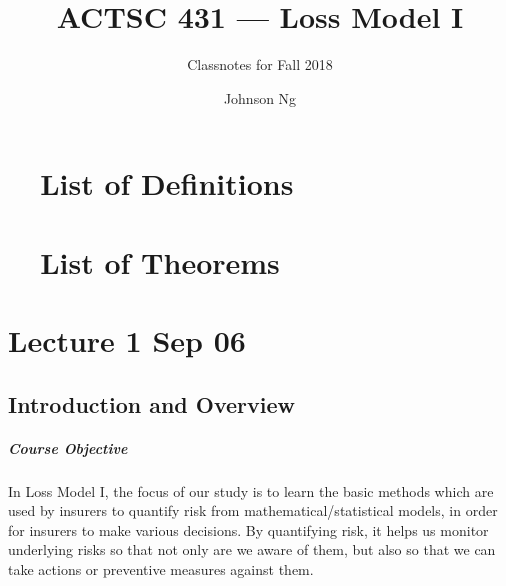 \documentclass[notoc,notitlepage]{tufte-book}
\title{ACTSC 431 --- Loss Model I}
\author{Johnson Ng}
\subtitle{Classnotes for Fall 2018}
\begin{document}
\hypersetup{pageanchor=false}
\maketitle
\hypersetup{pageanchor=true}
\begin{fullwidth}
\tableofcontents
\end{fullwidth}

\chapter*{\faBook\ \enspace\ List of Definitions}
\begin{fullwidth}
\end{fullwidth}

\chapter*{\faCoffee\ \enspace\ List of Theorems}
\begin{fullwidth}
\end{fullwidth}

\chapter{Lecture 1 Sep 06}%
\label{chp:lecture_1_sep_06}

\section{Introduction and Overview}%
\label{sec:introduction_and_overview}

\paragraph{Course Objective} In Loss Model I, the focus of our study is to learn the basic methods which are used by insurers to quantify risk from mathematical/statistical models, in order for insurers to make various decisions. By quantifying risk, it helps us monitor underlying risks so that not only are we aware of them, but also so that we can take actions or preventive measures against them.
\end{document}
